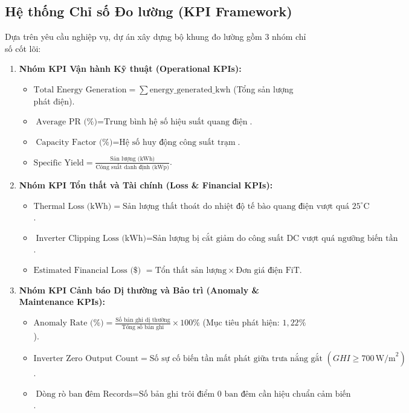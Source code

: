 \documentclass[12pt, a4paper]{report}
\begin{document}
\subsection{Hệ thống Chỉ số Đo lường (KPI Framework)}
Dựa trên yêu cầu nghiệp vụ, dự án xây dựng bộ khung đo lường gồm 3 nhóm chỉ số cốt lõi:
\begin{enumerate}[label=\arabic*., leftmargin=*]
    \item \textbf{Nhóm KPI Vận hành Kỹ thuật (Operational KPIs):}
    \begin{itemize}[noitemsep]
        \item $\text{Total Energy Generation} = \sum \text{energy\_generated\_kwh}$ (Tổng sản lượng phát điện).
        \item $\text{Average PR (\%)} = \text{Trung bình hệ số hiệu suất quang điện}$.
        \item $\text{Capacity Factor (\%)} = \text{Hệ số huy động công suất trạm}$.
        \item $\text{Specific Yield} = \frac{\text{Sản lượng (kWh)}}{\text{Công suất danh định (kWp)}}$.
    \end{itemize}
    \item \textbf{Nhóm KPI Tổn thất và Tài chính (Loss \& Financial KPIs):}
    \begin{itemize}[noitemsep]
        \item $\text{Thermal Loss (kWh)} = \text{Sản lượng thất thoát do nhiệt độ tế bào quang điện vượt quá } 25^\circ\text{C}$.
        \item $\text{Inverter Clipping Loss (kWh)} = \text{Sản lượng bị cắt giảm do công suất DC vượt quá ngưỡng biến tần}$.
        \item $\text{Estimated Financial Loss (\$) } = \text{Tổn thất sản lượng} \times \text{Đơn giá điện FiT}$.
    \end{itemize}
    \item \textbf{Nhóm KPI Cảnh báo Dị thường và Bảo trì (Anomaly \& Maintenance KPIs):}
    \begin{itemize}[noitemsep]
        \item $\text{Anomaly Rate (\%)} = \frac{\text{Số bản ghi dị thường}}{\text{Tổng số bản ghi}} \times 100\%$ (Mục tiêu phát hiện: $1{,}22\%$).
        \item $\text{Inverter Zero Output Count} = \text{Số sự cố biến tần mất phát giữa trưa nắng gắt } (GHI \ge 700\,\text{W/m}^2)$.
        \item $\text{Dòng rò ban đêm Records} = \text{Số bản ghi trôi điểm 0 ban đêm cần hiệu chuẩn cảm biến}$.
    \end{itemize}
\end{enumerate}
\end{document}
